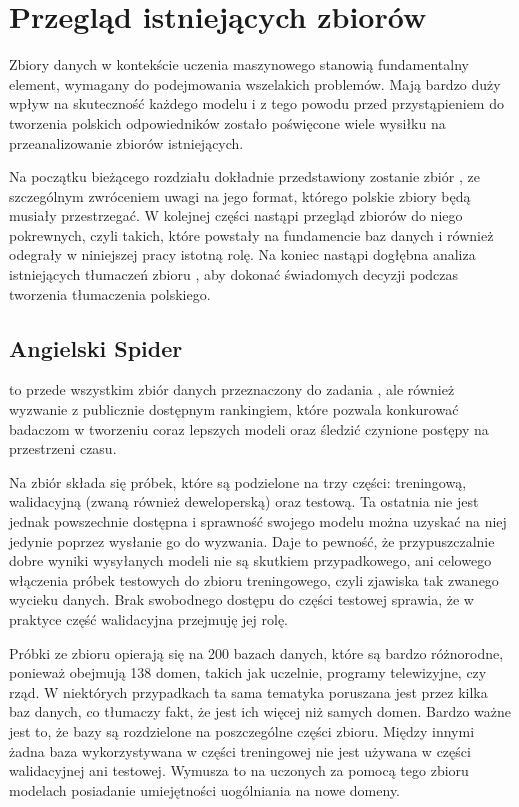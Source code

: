 \chapter{Przegląd istniejących zbiorów}
Zbiory danych w kontekście uczenia maszynowego stanowią fundamentalny element, wymagany do podejmowania wszelakich problemów. Mają bardzo duży wpływ na skuteczność każdego modelu i z tego powodu przed przystąpieniem do tworzenia polskich odpowiedników zostało poświęcone wiele wysiłku na przeanalizowanie zbiorów istniejących.

Na początku bieżącego rozdziału dokładnie przedstawiony zostanie zbiór , ze szczególnym zwróceniem uwagi na jego format, którego polskie zbiory będą musiały przestrzegać. W kolejnej części nastąpi przegląd zbiorów do niego pokrewnych, czyli takich, które powstały na fundamencie baz danych  i również odegrały w niniejszej pracy istotną rolę. Na koniec nastąpi dogłębna analiza istniejących tłumaczeń zbioru , aby dokonać świadomych decyzji podczas tworzenia tłumaczenia polskiego.

\section{Angielski Spider}
 to przede wszystkim zbiór danych przeznaczony do zadania , ale również wyzwanie z publicznie dostępnym rankingiem, które pozwala konkurować badaczom w tworzeniu coraz lepszych modeli oraz śledzić czynione postępy na przestrzeni czasu.

Na zbiór składa się  próbek, które są podzielone na trzy części: treningową, walidacyjną (zwaną również deweloperską) oraz testową. Ta ostatnia nie jest jednak powszechnie dostępna i sprawność swojego modelu można uzyskać na niej jedynie poprzez wysłanie go do wyzwania. Daje to pewność, że przypuszczalnie dobre wyniki wysyłanych modeli nie są skutkiem przypadkowego, ani celowego włączenia próbek testowych do zbioru treningowego, czyli zjawiska tak zwanego wycieku danych. Brak swobodnego dostępu do części testowej sprawia, że w praktyce część walidacyjna przejmuję jej rolę.

Próbki ze zbioru  opierają się na 200 bazach danych, które są bardzo różnorodne, ponieważ obejmują 138 domen, takich jak uczelnie, programy telewizyjne, czy rząd. W niektórych przypadkach ta sama tematyka poruszana jest przez kilka baz danych, co tłumaczy fakt, że jest ich więcej niż samych domen. Bardzo ważne jest to, że bazy są rozdzielone na poszczególne części zbioru. Między innymi żadna baza wykorzystywana w części treningowej nie jest używana w części walidacyjnej ani testowej. Wymusza to na uczonych za pomocą tego zbioru modelach posiadanie umiejętności uogólniania na nowe domeny.

